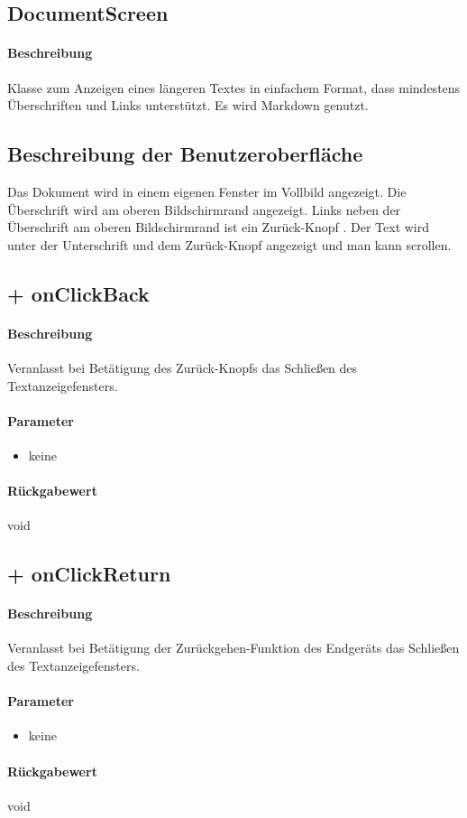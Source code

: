 \subsection{DocumentScreen}
\paragraph*{Beschreibung}
Klasse zum Anzeigen eines längeren Textes in einfachem Format, 
dass mindestens Überschriften und Links unterstützt.
Es wird Markdown genutzt.

\subsection{Beschreibung der Benutzeroberfläche}
Das Dokument wird in einem eigenen Fenster im Vollbild angezeigt.
Die Überschrift wird am oberen Bildschirmrand angezeigt.
Links neben der Überschrift am oberen Bildschirmrand ist ein \dq Zurück-Knopf \dq{}.
Der Text wird unter der Unterschrift und dem \dq Zurück-Knopf \dq{} angezeigt und man kann scrollen.

\subsection{+ onClickBack}%
\paragraph*{Beschreibung}
Veranlasst bei Betätigung des \dq Zurück-Knopfs \dq{} das Schließen des Textanzeigefensters.
\paragraph*{Parameter}
\begin{itemize}
    \item keine
\end{itemize}
\paragraph*{Rückgabewert}
void

\subsection{+ onClickReturn}%
\paragraph*{Beschreibung}
Veranlasst bei Betätigung der Zurückgehen-Funktion des Endgeräts das Schließen des Textanzeigefensters.
\paragraph*{Parameter}
\begin{itemize}
    \item keine
\end{itemize}
\paragraph*{Rückgabewert}
void